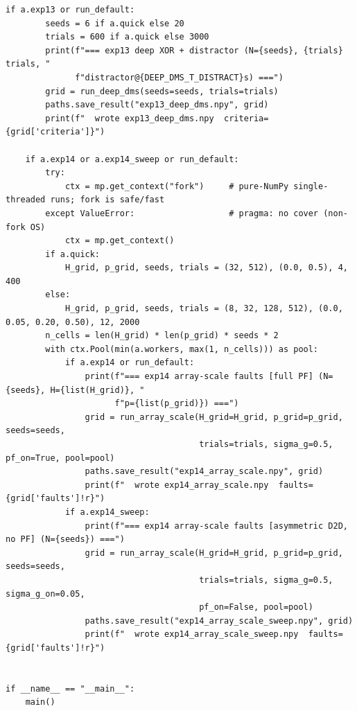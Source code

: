 \begin{lstlisting}[caption={mrl\_trace/deep.py},label={lst:siox-src-deep}]
    if a.exp13 or run_default:
        seeds = 6 if a.quick else 20
        trials = 600 if a.quick else 3000
        print(f"=== exp13 deep XOR + distractor (N={seeds}, {trials} trials, "
              f"distractor@{DEEP_DMS_T_DISTRACT}s) ===")
        grid = run_deep_dms(seeds=seeds, trials=trials)
        paths.save_result("exp13_deep_dms.npy", grid)
        print(f"  wrote exp13_deep_dms.npy  criteria={grid['criteria']}")

    if a.exp14 or a.exp14_sweep or run_default:
        try:
            ctx = mp.get_context("fork")     # pure-NumPy single-threaded runs; fork is safe/fast
        except ValueError:                   # pragma: no cover (non-fork OS)
            ctx = mp.get_context()
        if a.quick:
            H_grid, p_grid, seeds, trials = (32, 512), (0.0, 0.5), 4, 400
        else:
            H_grid, p_grid, seeds, trials = (8, 32, 128, 512), (0.0, 0.05, 0.20, 0.50), 12, 2000
        n_cells = len(H_grid) * len(p_grid) * seeds * 2
        with ctx.Pool(min(a.workers, max(1, n_cells))) as pool:
            if a.exp14 or run_default:
                print(f"=== exp14 array-scale faults [full PF] (N={seeds}, H={list(H_grid)}, "
                      f"p={list(p_grid)}) ===")
                grid = run_array_scale(H_grid=H_grid, p_grid=p_grid, seeds=seeds,
                                       trials=trials, sigma_g=0.5, pf_on=True, pool=pool)
                paths.save_result("exp14_array_scale.npy", grid)
                print(f"  wrote exp14_array_scale.npy  faults={grid['faults']!r}")
            if a.exp14_sweep:
                print(f"=== exp14 array-scale faults [asymmetric D2D, no PF] (N={seeds}) ===")
                grid = run_array_scale(H_grid=H_grid, p_grid=p_grid, seeds=seeds,
                                       trials=trials, sigma_g=0.5, sigma_g_on=0.05,
                                       pf_on=False, pool=pool)
                paths.save_result("exp14_array_scale_sweep.npy", grid)
                print(f"  wrote exp14_array_scale_sweep.npy  faults={grid['faults']!r}")


if __name__ == "__main__":
    main()
\end{lstlisting}

